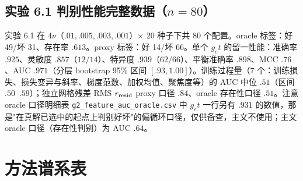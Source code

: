 \documentclass[fontset=windows,11pt]{ctexart}
\numberwithin{equation}{section}
\begin{document}
\subsection{实验 6.1 判别性能完整数据（$n=80$）}

实验 6.1 在 4$\nu$（$.01,.005,.003,.001$）$\times$ 20 种子下共 80 个配置。oracle 标签：好 49/坏 31、存在率 $.613$。proxy 标签：好 14/坏 66。单个 $g_et$ 的留一性能：准确率 $.925$、灵敏度 $.857$（$12/14$）、特异度 $.939$（$62/66$）、平衡准确率 $.898$、MCC $.76$、AUC $.971$（分层 bootstrap 95\% 区间 $[.93,1.00]$）。训练过程量（$7$ 个：训练损失、损失变异与斜率、梯度范数、加权均值、聚焦度等）的 AUC 中位 $.51$（区间 $.50$--$.59$）；独立网格残差 RMS $r_{\rm resid}$ proxy 口径 $.84$、oracle 存在性口径 $.51$。注意 oracle 口径明细表 \texttt{g2\_\hspace{0pt}feature\_\hspace{0pt}auc\_\hspace{0pt}oracle.csv} 中 $g_et$ 一行另有 $.931$ 的数值，那是"在真解已选中的起点上判别好坏"的偏循环口径，仅供备查，主文不使用；主文 oracle 口径（存在性判别）为 AUC $.64$。

\section{方法谱系表}\label{app:lineage}
\end{document}
